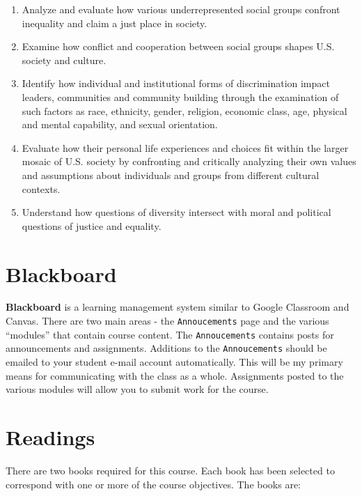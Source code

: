 \documentclass[
]{book}
\begin{document}
\begin{enumerate}
\def\labelenumi{\arabic{enumi}.}
\item
  Analyze and evaluate how various underrepresented social groups confront inequality and claim a just place in society.
\item
  Examine how conflict and cooperation between social groups shapes U.S. society and culture.
\item
  Identify how individual and institutional forms of discrimination impact leaders, communities and community building through the examination of such factors as race, ethnicity, gender, religion, economic class, age, physical and mental capability, and sexual orientation.
\item
  Evaluate how their personal life experiences and choices fit within the larger mosaic of U.S. society by confronting and critically analyzing their own values and assumptions about individuals and groups from different cultural contexts.
\item
  Understand how questions of diversity intersect with moral and political questions of justice and equality.
\end{enumerate}

\hypertarget{blackboard}{%
\section{Blackboard}\label{blackboard}}

\textbf{Blackboard} is a learning management system similar to Google Classroom and Canvas. There are two main areas - the \texttt{Annoucements} page and the various ``modules'' that contain course content. The \texttt{Annoucements} contains posts for announcements and assignments. Additions to the \texttt{Annoucements} should be emailed to your student e-mail account automatically. This will be my primary means for communicating with the class as a whole. Assignments posted to the various modules will allow you to submit work for the course.

\hypertarget{readings}{%
\section{Readings}\label{readings}}

There are two books required for this course. Each book has been selected to correspond with one or more of the course objectives. The books are:
\end{document}
